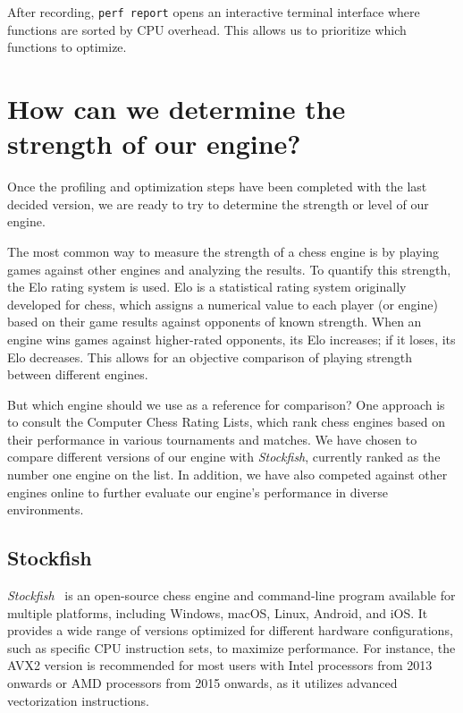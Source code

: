 \noindent After recording, \texttt{perf report} opens an interactive terminal interface where functions are sorted by CPU overhead. This allows us to prioritize which functions to optimize.

\section{How can we determine the strength of our engine?}

Once the profiling and optimization steps have been completed with the last decided version, we are ready to try to determine the strength or level of our engine.

\vspace{1em}

\noindent The most common way to measure the strength of a chess engine is by playing games against other engines and analyzing the results. To quantify this strength, the Elo rating system is used. Elo is a statistical rating system originally developed for chess, which assigns a numerical value to each player (or engine) based on their game results against opponents of known strength. When an engine wins games against higher-rated opponents, its Elo increases; if it loses, its Elo decreases. This allows for an objective comparison of playing strength between different engines.

\vspace{1em}

\noindent But which engine should we use as a reference for comparison? One approach is to consult the Computer Chess Rating Lists, which rank chess engines based on their performance in various tournaments and matches. We have chosen to compare different versions of our engine with \textit{Stockfish}, currently ranked as the number one engine on the list. In addition, we have also competed against other engines online to further evaluate our engine's performance in diverse environments.

\subsection{Stockfish}

\textit{Stockfish}~\cite{Stockfish} is an open-source chess engine and command-line program available for multiple platforms, including Windows, macOS, Linux, Android, and iOS. It provides a wide range of versions optimized for different hardware configurations, such as specific CPU instruction sets, to maximize performance. For instance, the AVX2 version is recommended for most users with Intel processors from 2013 onwards or AMD processors from 2015 onwards, as it utilizes advanced vectorization instructions.

